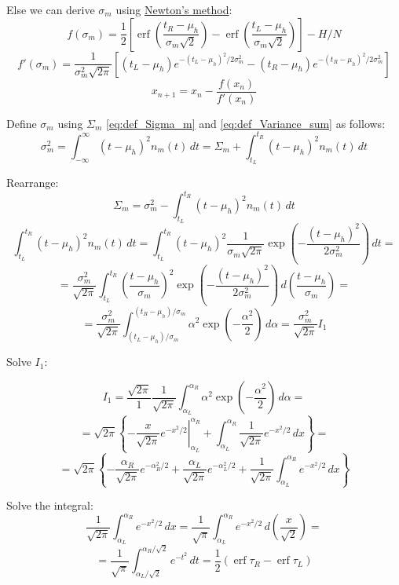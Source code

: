 \documentclass[12pt]{article}
\begin{document}
Else we can derive \(\sigma_m\) using \href{https://en.wikipedia.org/wiki/Newton%27s_method}{Newton's method}:
\[
f(\sigma_m) = \frac{1}{2} \left[
    \operatorname{erf}\left(\frac{t_R - \mu_h}{\sigma_m\sqrt{2}}\right) -
    \operatorname{erf}\left(\frac{t_L - \mu_h}{\sigma_m\sqrt{2}}\right)
\right] - H / N
\]
\[
f'(\sigma_m) = \frac{1}{\sigma_m^2\sqrt{2\pi}} \left[
    \left(t_L - \mu_h\right) e^{-(t_L - \mu_h)^2/2\sigma_m^2} -
    \left(t_R - \mu_h\right) e^{-(t_R - \mu_h)^2/2\sigma_m^2}
\right]
\]
\[
    x_{n+1}=x_{n}-{\frac {f(x_{n})}{f'(x_{n})}}
\]


Define \( \sigma_m \) using \(\Sigma_m\) \eqref{eq:def_Sigma_m} and \eqref{eq:def_Variance_sum} as follows:
\[
\sigma_m^2 = \int_{-\infty}^{\infty} \left( t - \mu_h \right)^2 n_m(t) \,dt =
\Sigma_m + \int_{t_L}^{t_R} \left( t - \mu_h \right)^2 n_m(t) \,dt
\]

Rearrange:
\[
\Sigma_m = \sigma_m^2 - \int_{t_L}^{t_R} \left( t - \mu_h \right)^2 n_m(t) \,dt
\]
\[
\int_{t_L}^{t_R} \left( t - \mu_h \right)^2 n_m(t) \,dt =
\int_{t_L}^{t_R} \left( t - \mu_h \right)^2 \frac{1}{\sigma_m\sqrt{2 \pi }} \exp\left(-\frac{(t - \mu_h)^2}{2\sigma_m^2} \right) \,dt =
\]
\[
    = \frac{\sigma_m^2}{\sqrt{2\pi}}
    \int_{t_L}^{t_R}
    \left(\frac{t - \mu_h}{\sigma_m}\right)^2
    \exp\left(-\frac{(t - \mu_h)^2}{2\sigma_m^2} \right)
    \,d\left(\frac{t - \mu_h}{\sigma_m}\right) =
\]
\[
    = \frac{\sigma_m^2}{\sqrt{2\pi}}
    \int_{(t_L - \mu_h)/\sigma_m}^{(t_R - \mu_h)/\sigma_m}
    \alpha^2
    \exp\left(-\frac{\alpha^2}{2} \right)
    \,d\alpha = \frac{\sigma_m^2}{\sqrt{2\pi}} I_1
\]

Solve \(I_1\):

\[
    I_1 = 
    \frac{\sqrt{2\pi}}{1}
    \frac{1}{\sqrt{2\pi}}
    \int_{\alpha_L}^{\alpha_R}
    \alpha^2
    \exp\left(-\frac{\alpha^2}{2} \right)
    \,d\alpha =
\]
\[
    = \sqrt{2\pi}
    \left\{
        \left.
        -\frac{x}{\sqrt{2\pi}} e^{-x^2/2}
        \right|_{\alpha_L}^{\alpha_R} +
        \int_{\alpha_L}^{\alpha_R}
        \frac{1}{\sqrt{2\pi}} e^{-x^2/2} \,dx
    \right\} =
\]
\[
    = \sqrt{2\pi}
    \left\{
        -\frac{\alpha_R}{\sqrt{2\pi}} e^{-\alpha_R^2/2} +
        \frac{\alpha_L}{\sqrt{2\pi}} e^{-\alpha_L^2/2} +
        \frac{1}{\sqrt{2\pi}} \int_{\alpha_L}^{\alpha_R}
        e^{-x^2/2} \,dx
    \right\}
\]

Solve the integral:
\[
    \frac{1}{\sqrt{2\pi}} \int_{\alpha_L}^{\alpha_R}
    e^{-x^2/2} \,dx =
    \frac{1}{\sqrt{\pi}} \int_{\alpha_L}^{\alpha_R}
    e^{-x^2/2} \,d\left(\frac{x}{\sqrt{2}}\right) =
\]
\[
    = \frac{1}{\sqrt{\pi}} \int_{\alpha_L/\sqrt{2}}^{\alpha_R/\sqrt{2}}
    e^{-t^2} \,dt =
    \frac{1}{2} \left(
    \operatorname{erf} \tau_R -
    \operatorname{erf} \tau_L
    \right)
\]
\end{document}
